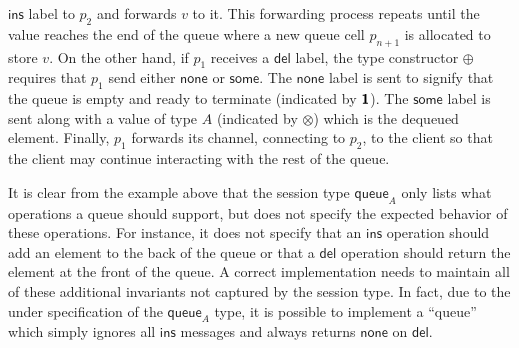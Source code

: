 $\textsf{ins}$ label to $p_2$ and forwards $v$ to it.  This forwarding process
repeats until the value reaches the end of the queue where a new queue cell
$p_{n+1}$ is allocated to store $v$. On the other hand, if $p_1$ receives a
$\textsf{del}$ label, the type constructor $\oplus$ requires that $p_1$ send
either $\textsf{none}$ or $\textsf{some}$.  The $\textsf{none}$ label is sent to
signify that the queue is empty and ready to terminate (indicated by $\textbf{\textsf{1}}$).
The $\textsf{some}$ label is sent along with a value of type $A$ (indicated by $\otimes$)
which is the dequeued element. Finally, $p_1$ forwards its channel, connecting to
$p_2$, to the client so that the client may continue interacting with the rest of the queue.

It is clear from the example above that the session type $\textsf{queue}_A$ only lists
what operations a queue should support, but does not specify the expected behavior of
these operations. For instance, it does not specify that an $\textsf{ins}$ operation should
add an element to the back of the queue or that a $\textsf{del}$ operation should return the
element at the front of the queue. A correct implementation needs to maintain all of
these additional invariants not captured by the session type. In fact, due to the under
specification of the $\textsf{queue}_A$ type, it is possible to implement a ``queue''
which simply ignores all $\textsf{ins}$ messages and always returns $\textsf{none}$ on $\textsf{del}$.



